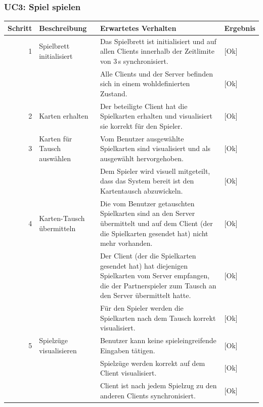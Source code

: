 \documentclass[12pt,halfparskip]{scrartcl}
\begin{document}
\subsubsection{UC3: Spiel spielen}
	\begin {tabular}{r | p{3cm} | p{8cm} | l}
		\toprule
		\textbf{Schritt} & \textbf{Beschreibung} & \textbf{Erwartetes Verhalten} & \textbf{Ergebnis} \\
		\midrule
		1 & Spielbrett initialisiert & Das Spielbrett ist initialisiert und auf allen Clients innerhalb der Zeitlimite von 3\,s synchronisiert. & [Ok] \\
		 \cline{3-4} & & Alle Clients und der Server befinden sich in einem wohldefinierten Zustand. & [Ok] \\
		\midrule
		2 & Karten erhalten & Der beteiligte Client hat die Spielkarten erhalten und visualisiert sie korrekt für den Spieler. & [Ok] \\
		\midrule
		3 & Karten für Tausch auswählen & Vom Benutzer ausgewählte Spielkarten sind visualisiert und als ausgewählt hervorgehoben. & [Ok] \\
		 \cline{3-4} & & Dem Spieler wird visuell mitgeteilt, dass das System bereit ist den Kartentausch abzuwickeln. & [Ok] \\
		\midrule
		4 & Karten-Tausch übermitteln & Die vom Benutzer getauschten Spielkarten sind an den Server übermittelt und auf dem Client (der die Spielkarten gesendet hat) nicht mehr vorhanden. & [Ok] \\
		 \cline{3-4} & & Der Client (der die Spielkarten gesendet hat) hat diejenigen Spielkarten vom Server empfangen, die der Partnerspieler zum Tausch an den Server übermittelt hatte. & [Ok] \\
		 \cline{3-4} & & Für den Spieler werden die Spielkarten nach dem Tausch korrekt visualisiert. & [Ok] \\
		\midrule
		5 & Spielzüge visualisieren & Benutzer kann keine spieleingreifende Eingaben tätigen. & [Ok] \\
		 \cline{3-4} & & Spielzüge werden korrekt auf dem Client visualisiert. & [Ok] \\
		 \cline{3-4} & & Client ist nach jedem Spielzug zu den anderen Clients synchronisiert. & [Ok] \\
		\midrule
	\end{tabular}
		
\end{document}
